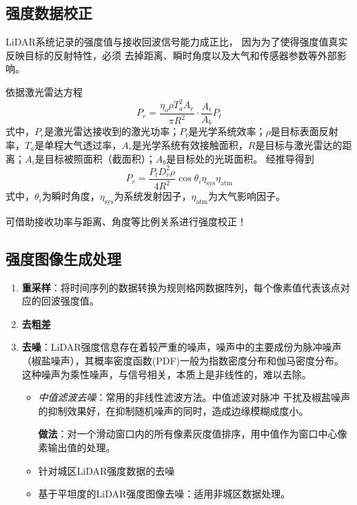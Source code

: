 \subsection{强度数据校正}LiDAR系统记录的强度值与接收回波信号能力成正比，
因为为了使得强度值真实反映目标的反射特性，必须
去掉距离、瞬时角度以及大气和传感器参数等外部影
响。

依据激光雷达方程
\begin{equation}
P_r = \dfrac{\eta_o \rho T_a^2 A_r}{\pi R^2} \cdot \dfrac{A_i}{A_b}P_t
\end{equation}
式中，$ P_r $是激光雷达接收到的激光功率；$ P_t $是光学系统效率；$ \rho $是目标表面反射率，$ T_a $是单程大气透过率，$ A_r $是光学系统有效接触面积，$ R $是目标与激光雷达的距离；$ A_i $是目标被照面积（截面积）；$ A_b $是目标处的光斑面积。
经推导得到
\begin{equation}
P_r = \dfrac{P_t D_r^2 \rho}{4R^2} \cos \theta_i \eta_{\text{sys}} \eta _{\text{atm}}
\end{equation}
式中，$ \theta_i $为瞬时角度，$ \eta_{\text{sys}} $为系统发射因子，$ \eta _{\text{atm}} $为大气影响因子。

可借助接收功率与距离、角度等比例关系进行强度校正！

\subsection{强度图像生成处理}
\begin{enumerate}
	\item \textbf{重采样}：将时间序列的数据转换为规则格网数据阵列，每个像素值代表该点对应的回波强度值。
	\item \textbf{去粗差}
	\item \textbf{去噪}：LiDAR强度信息存在着较严重的噪声，噪声中的主要成份为脉冲噪声（椒盐噪声），其概率密度函数(PDF)一般为指数密度分布和伽马密度分布。这种噪声为乘性噪声，与信号相关，本质上是非线性的，难以去除。
		\begin{itemize}
			\item \textit{中值滤波去噪}：常用的非线性滤波方法。中值滤波对脉冲 干扰及椒盐噪声的抑制效果好，在抑制随机噪声的同时，造成边缘模糊成度小。
			
				\textbf{做法}：对一个滑动窗口内的所有像素灰度值排序，用中值作为窗口中心像素输出值的处理。
			\item {\kaishu 针对城区LiDAR强度数据的去噪}
			\item {\kaishu 基于平坦度的LiDAR强度图像去噪}：适用非城区数据处理。
		\end{itemize}
\end{enumerate}

